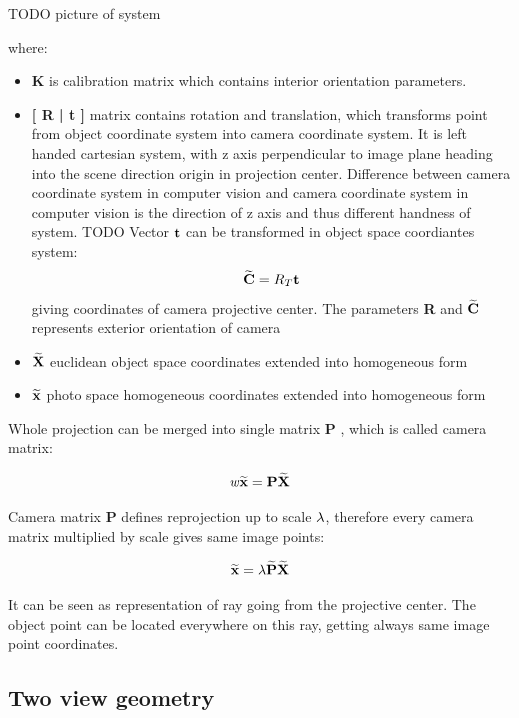 \documentclass[a4paper,12pt]{report}
\newcommand{\ematr}[1]{
{\bf #1}
}
\newcommand{\evect}[1]{
{\bf #1}
}
\newcommand{\ehvect}[1]{
{\bf \widetilde{#1}}
}
\newcommand{\escal}[1]{
{\it #1}
}
\begin{document}
TODO picture of system

where:

\begin{itemize}
\item \ematr{K} is calibration matrix which contains interior orientation parameters.  
\item \ematr{[\ematr{R}|\evect{t}]} matrix contains rotation and translation, which transforms point from object coordinate system 
	      into camera coordinate system. It is left handed cartesian system, with z axis perpendicular to image plane heading into the scene direction
	      origin in projection center. Difference between camera coordinate 
	      system in computer vision and camera coordinate system in computer vision is the direction 
	      of z axis and thus different handness of system. TODO 
	      Vector $\evect{t}$ can  be transformed in object space coordiantes system:
	      \begin{equation}
	      \ehvect{C} = R_{T}\evect{t}
	      \end{equation}
	      giving coordinates of camera projective center. The parameters \ematr{R} and $\ehvect{C}$
	      represents exterior orientation of camera
	      
\item $\ehvect{X}$ euclidean object space coordinates extended into homogeneous form
\item $\ehvect{x}$ photo space homogeneous coordinates extended into homogeneous form
\end{itemize}

Whole projection can be merged into single matrix \ematr{P}, which is called camera matrix:

\begin{equation}
\escal{w} \ehvect{x} = \ematr{P} \ehvect{X}
\label{eq:p_abbr}
\end{equation}

Camera matrix \ematr{P} defines reprojection up to scale $\escal{\lambda}$, therefore every camera matrix multiplied by scale gives same image points:

\begin{equation}
\ehvect{x}=\lambda\ehvect{P}\ehvect{X}
 \end{equation}

It can be seen as representation of ray going from the projective center. The object point can be located everywhere on this ray, getting always 
same image point coordinates.

\subsection{Two view geometry}
\end{document}
